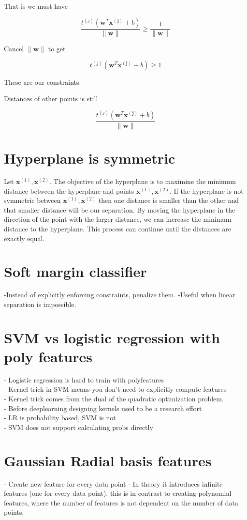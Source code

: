 \documentclass{article}
\newcommand{\beq}{\begin{equation}}
\newcommand{\eeq}{\end{equation}}
\begin{document}
That is we must have

\beq
\frac{t^{(j)}(\pmb{w}^T\pmb{x^{(j)}}+b)}{\|\pmb{w}\|} \ge \frac{1}{\|\pmb{w}\|}
\eeq

Cancel $\|\pmb{w}\|$ to get


\beq
{t^{(j)}(\pmb{w}^T\pmb{x^{(j)}}+b)} \ge 1
\eeq

These are our constraints.

Distances of other points is still

\beq
\frac{t^{(j)}(\pmb{w}^T\pmb{x^{(j)}}+b)}{\|\pmb{w}\|} 
\eeq


\section{Hyperplane is symmetric}
Let $\pmb{x}^{(1)},\pmb{x}^{(2)}$. The objective of the hyperplane is to maximine the minimum distance between the hyperplane and points $\pmb{x}^{(1)},\pmb{x}^{(2)}$. If the hyperplane is not symmetric between $\pmb{x}^{(1)},\pmb{x}^{(2)}$ then one distance is smaller than the other and that smaller distance will be our separation. By moving the hyperplane in the direction of the point with the larger distance, we can increase the minimum distance to the hyperplane. This process can continue until the distances are exactly equal.

\section{Soft margin classifier}
-Instead of explicitly enforcing constraints, penalize them.
-Useful when linear separation is impossible.

\section{SVM vs logistic regression with poly features}
- Logistic regression is hard to train with polyfeatures\\
- Kernel trick in SVM means you don't need to explicitly compute features\\
- Kernel trick comes from the dual of the quadratic optimization problem.\\
- Before deeplearning designing kernels used to be a research effort\\
- LR is probability based, SVM is not\\
- SVM does not support calculating probs directly\\

\section{Gaussian Radial basis features}
- Create new feature for every data point
- In theory it introduces infinite features (one for every data point). this is in contrast to creating polynomial features, where the number of features is not dependent on the number of data points.
\end{document}
